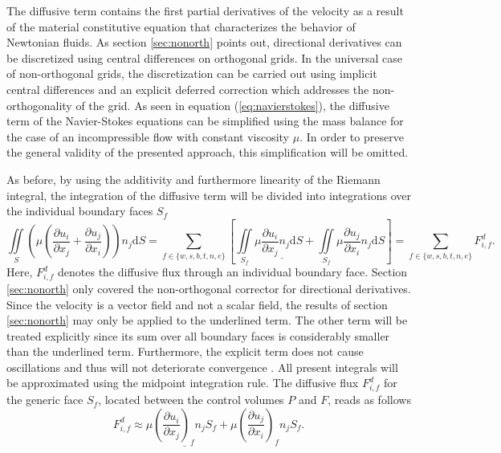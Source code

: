 The diffusive term contains the first partial derivatives of the velocity as a result of the material constitutive equation that characterizes the behavior of Newtonian fluids. As section \ref{sec:nonorth} points out, directional derivatives can be discretized using central differences on orthogonal grids. In the universal case of non-orthogonal grids, the discretization can be carried out using implicit central differences and an explicit deferred correction which addresses the non-orthogonality of the grid. As seen in equation (\ref{eq:navierstokes}), the diffusive term of the Navier-Stokes equations can be simplified using the mass balance for the case of an incompressible flow with constant viscosity \(\mu\). In order to preserve the general validity of the presented approach, this simplification will be omitted.

As before, by using the additivity and furthermore linearity of the Riemann integral, the integration of the diffusive term will be divided into integrations over the individual boundary faces \(S_f\) 
\begin{displaymath}
  \iint\limits_S \left(\mu \left( \frac{\partial u_i}{\partial x_j} + \frac{\partial u_j}{\partial x_i}\right)\right)n_j \mathrm{d}S 
  = \sum_{f \in \{w,s,b,t,n,e\}} \left[
    \iint\limits_{S_f} \mu \underline{\frac{\partial u_i}{\partial x_j}n_j \mathrm{d}S}
  + \iint\limits_{S_f} \mu \frac{\partial u_j}{\partial x_i}n_j \mathrm{d}S \right]
   = \sum_{f \in \{w,s,b,t,n,e\}} F_{i,f}^{d}.
\end{displaymath}
Here, \(F_{i,f}^{d}\) denotes the diffusive flux through an individual boundary face. Section \ref{sec:nonorth} only covered the non-orthogonal corrector for directional derivatives. Since the velocity is a vector field and not a scalar field, the results of section \ref{sec:nonorth} may only be applied to the underlined term. The other term will be treated explicitly since its sum over all boundary faces is considerably smaller than the underlined term. Furthermore, the explicit term does not cause oscillations and thus will not deteriorate convergence \cite{ferziger02}. All present integrals will be approximated using the midpoint integration rule. The diffusive flux \(F_{i,f}^d\) for the generic face \(S_f\), located between the control volumes \(P\) and \(F\), reads as follows
\begin{displaymath}
  F_{i,f}^d \approx \mu \underline{\left(\frac{\partial u_i}{\partial x_j}\right)_f n_j S_f} + \mu \left(\frac{\partial u_j}{\partial x_i}\right)_f n_j S_f.
\end{displaymath}


